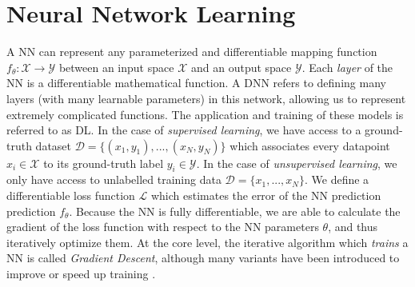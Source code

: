 \section{Neural Network Learning}

A \ac{NN} can represent any parameterized and differentiable mapping function 
$f_\theta : \mathcal{X} \rightarrow \mathcal{Y}$ 
between an input space $\mathcal{X}$ and an output space $\mathcal{Y}$. Each \emph{layer} of the 
\ac{NN} is a differentiable mathematical function. A \ac{DNN} refers to defining many layers 
(with many learnable parameters) in this network, allowing us to represent extremely complicated functions.
The application and training of these models is referred to as \ac{DL}.
In the case of \emph{supervised learning}, we have access to a ground-truth dataset $\mathcal{D} = 
\{(x_1, y_1), ..., (x_N, y_N)\}$ which associates every datapoint $x_i \in \mathcal{X}$ to its
ground-truth label $y_i \in \mathcal{Y}$. In the case of \emph{unsupervised learning}, we only 
have access to unlabelled training data $\mathcal{D} = \{x_1, ..., x_N\}$. 
We define a differentiable loss function $\mathcal{L}$ which estimates the error of the  \ac{NN}
prediction prediction $f_\theta$. Because the \ac{NN}
is fully differentiable, we are able to calculate the gradient of the loss function with respect 
to the \ac{NN} parameters $\theta$, and thus iteratively optimize them. At the core level,
the iterative algorithm which \emph{trains} a \ac{NN} is called \emph{Gradient Descent},
 although many variants have been introduced to improve or speed up training \citep{ruder2016overview}.

